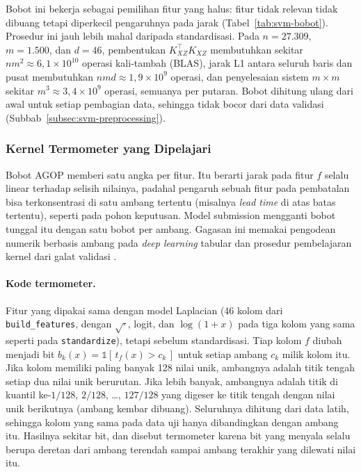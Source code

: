 Bobot ini bekerja sebagai pemilihan fitur yang halus: fitur tidak relevan tidak dibuang tetapi diperkecil pengaruhnya pada jarak (Tabel~\ref{tab:svm-bobot}). Prosedur ini jauh lebih mahal daripada standardisasi. Pada $n = 27.309$, $m = 1.500$, dan $d = 46$, pembentukan $K_{XZ}^{\top}K_{XZ}$ membutuhkan sekitar $n m^2 \approx 6{,}1 \times 10^{10}$ operasi kali-tambah (BLAS), jarak L1 antara seluruh baris dan pusat membutuhkan $n m d \approx 1{,}9 \times 10^{9}$ operasi, dan penyelesaian sistem $m \times m$ sekitar $m^3 \approx 3{,}4 \times 10^{9}$ operasi, semuanya per putaran. Bobot dihitung ulang dari awal untuk setiap pembagian data, sehingga tidak bocor dari data validasi (Subbab~\ref{subsec:svm-preprocessing}).

\subsubsection{Kernel Termometer yang Dipelajari}
\label{subsubsec:svm-kernel-belajar}
Bobot AGOP memberi satu angka per fitur. Itu berarti jarak pada fitur $f$ selalu linear terhadap selisih nilainya, padahal pengaruh sebuah fitur pada pembatalan bisa terkonsentrasi di satu ambang tertentu (misalnya \textit{lead time} di atas batas tertentu), seperti pada pohon keputusan. Model submission mengganti bobot tunggal itu dengan satu bobot per ambang. Gagasan ini memakai pengodean numerik berbasis ambang pada \textit{deep learning} tabular \cite{gorishniy2022embeddings} dan prosedur pembelajaran kernel dari galat validasi \cite{chapelle2002multiparam,owhadi2019kernelflows,lanckriet2004kernel}.

\paragraph{Kode termometer.} Fitur yang dipakai sama dengan model Laplacian (46 kolom dari \texttt{build\_features}, dengan $\sqrt{\cdot}$, logit, dan $\log(1+x)$ pada tiga kolom yang sama seperti pada \texttt{standardize}), tetapi sebelum standardisasi. Tiap kolom $f$ diubah menjadi bit $b_{k}(x) = \mathbb{1}[\,t_f(x) > c_k\,]$ untuk setiap ambang $c_k$ milik kolom itu. Jika kolom memiliki paling banyak 128 nilai unik, ambangnya adalah titik tengah setiap dua nilai unik berurutan. Jika lebih banyak, ambangnya adalah titik di kuantil ke-$1/128$, $2/128$, \dots, $127/128$ yang digeser ke titik tengah dengan nilai unik berikutnya (ambang kembar dibuang). Seluruhnya dihitung dari data latih, sehingga kolom yang sama pada data uji hanya dibandingkan dengan ambang itu. Hasilnya sekitar \SVMBaruJumlahBit{} bit, dan disebut termometer karena bit yang menyala selalu berupa deretan dari ambang terendah sampai ambang terakhir yang dilewati nilai itu.

